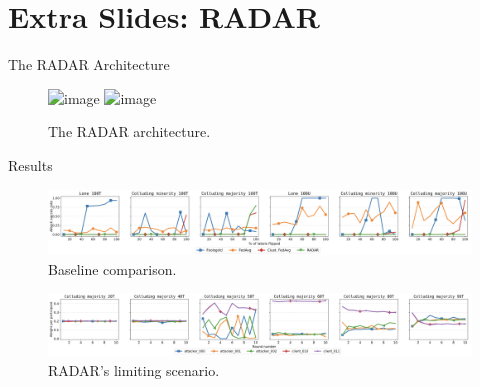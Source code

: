 \section*{Extra Slides: RADAR}

\begin{frame}
  \sectionpage
\end{frame}

\begin{frame}{The RADAR Architecture}

  \begin{figure}
    \centering
    \includegraphics<1>[width=.7\textwidth]{figures/radar/architecture}
    \includegraphics<2>[width=.7\textwidth]{figures/radar/architecture-xeval}
    \caption{The RADAR architecture.}
  \end{figure}


\end{frame}

\begin{frame}{Results}
  \begin{figure}
    \centering
    \includegraphics[width=.9\textwidth]{figures/radar/baselines.png}
    \caption{Baseline comparison.}
  \end{figure}
  \begin{figure}
    \centering
    \includegraphics[width=.9\textwidth]{figures/radar/limiting-case.png}
    \caption{RADAR's limiting scenario.}
  \end{figure}
\end{frame}
